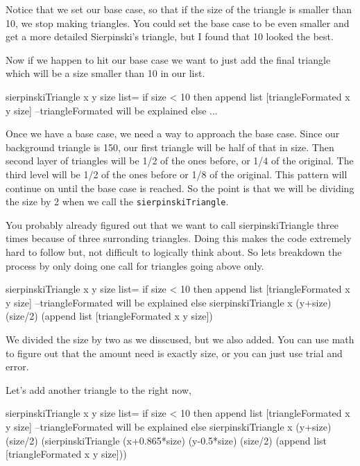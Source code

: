 \documentclass[12pt]{amsbook}
\begin{document}
Notice that we set our base case, so that if the size of the triangle is smaller than 10, we stop making triangles. You could set the base case to be even smaller and get a more detailed Sierpinski's triangle, but I found that 10 looked the best.

Now if we happen to hit our base case we want to just add the final triangle which will be a size smaller than 10 in our list. 

\begin{code}
	sierpinskiTriangle x y size list= 
	    if size < 10 then
	    	append list [triangleFormated x y size] --triangleFormated will be explained
	    else
	        ...
\end{code}

Once we have a base case, we need a way to approach the base case. Since our background triangle is 150, our first triangle will be half of that in size. Then second layer of triangles will be 1/2 of the ones before, or 1/4 of the original. The third level will be 1/2 of the ones before or 1/8 of the original. This pattern will continue on until the base case is reached. So the point is that we will be dividing the size by 2 when we call the \verb|sierpinskiTriangle|.

You probably already figured out that we want to call sierpinskiTriangle three times because of three surronding triangles. Doing this makes the code extremely hard to follow but, not difficult to logically think about. So lets breakdown the process by only doing one call for triangles going above only. 

\begin{code}
 	sierpinskiTriangle x y size list= 
	    if size < 10 then
	    	append list [triangleFormated x y size] --triangleFormated will be explained
	    else
	    	sierpinskiTriangle x (y+size) (size/2) (append list [triangleFormated x y size])
\end{code}
We divided the size by two as we disscused, but we also added. You can use math to figure out that the amount need is exactly size, or you can just use trial and error.

Let's add another triangle to the right now,

\begin{code}
	sierpinskiTriangle x y size list= 
	    if size < 10 then
	    	append list [triangleFormated x y size] --triangleFormated will be explained
	    else
        	sierpinskiTriangle x (y+size) (size/2) (sierpinskiTriangle (x+0.865*size) (y-0.5*size) (size/2) (append list [triangleFormated x y size]))
\end{code}
\end{document}

